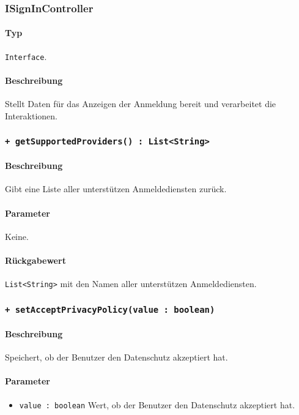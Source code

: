\subsubsection{ISignInController}\label{App_Signup_ISignInController}
\paragraph*{Typ}
\texttt{Interface}.
\paragraph*{Beschreibung}
Stellt Daten für das Anzeigen der Anmeldung bereit und verarbeitet die Interaktionen.

\subsubsection*{\texttt{+ getSupportedProviders() : List<String>}}\label{App_Signup_ISignInController_getSupportedProviders}%
\paragraph*{Beschreibung}
Gibt eine Liste aller unterstützen Anmeldediensten zurück.
\paragraph*{Parameter}
Keine.
\paragraph*{Rückgabewert}
\texttt{List<String>} mit den Namen aller unterstützen Anmeldediensten.

\subsubsection*{\texttt{+ setAcceptPrivacyPolicy(value : boolean)}}\label{App_Signup_ISignInController_setAcceptPrivacyPolicy}%
\paragraph*{Beschreibung}
Speichert, ob der Benutzer den Datenschutz akzeptiert hat.
\paragraph*{Parameter}
\begin{itemize}
    \item \texttt{value : boolean} Wert, ob der Benutzer den Datenschutz akzeptiert hat.
\end{itemize}
